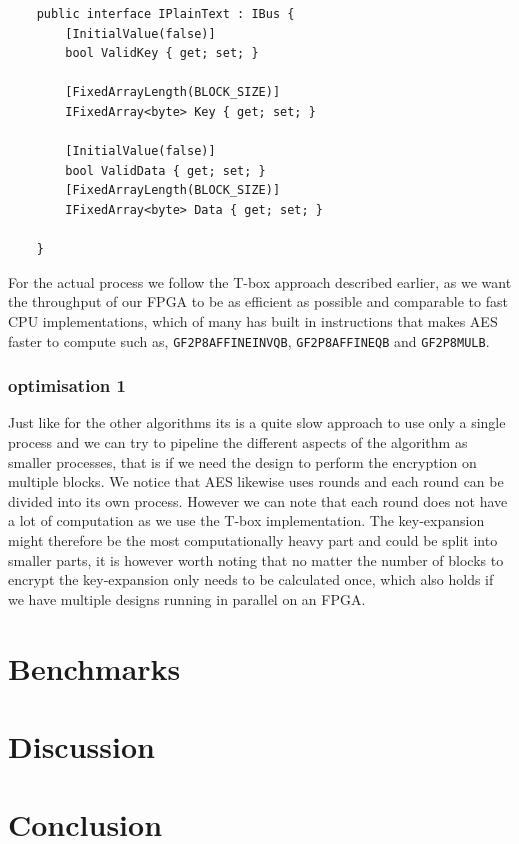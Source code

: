 \documentclass[a4paper]{article}
\begin{document}
\begin{verbatim}
    public interface IPlainText : IBus {
        [InitialValue(false)]
        bool ValidKey { get; set; }

        [FixedArrayLength(BLOCK_SIZE)]
        IFixedArray<byte> Key { get; set; }

        [InitialValue(false)]
        bool ValidData { get; set; }
        [FixedArrayLength(BLOCK_SIZE)]
        IFixedArray<byte> Data { get; set; }

    }
\end{verbatim}
For the actual process we follow the T-box approach described earlier, as we want the throughput of our FPGA to be as efficient as possible and comparable to fast CPU implementations, which of many has built in instructions that makes AES faster to compute such as, \texttt{GF2P8AFFINEINVQB}, \texttt{GF2P8AFFINEQB} and \texttt{GF2P8MULB}.
\subsubsection{optimisation 1}
\label{AESopt}
Just like for the other algorithms its is a quite slow approach to use only a single process and we can try to pipeline the different aspects of the algorithm as smaller processes, that is if we need the design to perform the encryption on multiple blocks. We notice that AES likewise uses rounds and each round can be divided into its own process. However we can note that each round does not have a lot of computation as we use the T-box implementation. The key-expansion might therefore be the most computationally heavy part and could be split into smaller parts, it is however worth noting that no matter the number of blocks to encrypt the key-expansion only needs to be calculated once, which also holds if we have multiple designs running in parallel on an FPGA.

\section{Benchmarks}
\label{sec:org843cc13}

\section{Discussion}
\label{sec:org55cf19e}

\section{Conclusion}
\label{sec:orgb0c02c0}




\begin{appendix}

\end{appendix}
\end{document}
